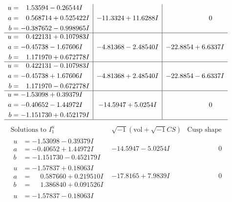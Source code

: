 \documentclass[1p]{elsarticle_modified}
\theoremstyle{definition}
\newcommand{\I}{\sqrt{-1}}
\begin{document}
$$\begin{array}{c|c|c}
\begin{aligned}
u &= \phantom{-}1.53594 - 0.26544 I \\
a &= \phantom{-}0.568714 + 0.525422 I \\
b &= -0.387652 - 0.998965 I\end{aligned}
 & -11.3324 + 11.6288 I & \phantom{-0.000000 } 0 \\ \hline\begin{aligned}
u &= \phantom{-}0.422131 + 0.107983 I \\
a &= -0.45738 - 1.67606 I \\
b &= \phantom{-}1.171970 + 0.672778 I\end{aligned}
 & -4.81368 - 2.48540 I & -22.8854 + 6.6337 I \\ \hline\begin{aligned}
u &= \phantom{-}0.422131 - 0.107983 I \\
a &= -0.45738 + 1.67606 I \\
b &= \phantom{-}1.171970 - 0.672778 I\end{aligned}
 & -4.81368 + 2.48540 I & -22.8854 - 6.6337 I \\ \hline\begin{aligned}
u &= -1.53098 + 0.39379 I \\
a &= -0.40652 - 1.44972 I \\
b &= -1.151730 + 0.452179 I\end{aligned}
 & -14.5947 + 5.0254 I & \phantom{-0.000000 } 0\\
 \hline 
 \end{array}$$\newpage$$\begin{array}{c|c|c}  
\text{Solutions to }I^u_{1}& \I (\text{vol} + \sqrt{-1}CS) & \text{Cusp shape}\\
 \hline 
\begin{aligned}
u &= -1.53098 - 0.39379 I \\
a &= -0.40652 + 1.44972 I \\
b &= -1.151730 - 0.452179 I\end{aligned}
 & -14.5947 - 5.0254 I & \phantom{-0.000000 } 0 \\ \hline\begin{aligned}
u &= -1.57837 + 0.18063 I \\
a &= \phantom{-}0.587660 + 0.219510 I \\
b &= \phantom{-}1.386840 + 0.091526 I\end{aligned}
 & -17.8165 + 7.9839 I & \phantom{-0.000000 } 0 \\ \hline\begin{aligned}
u &= -1.57837 - 0.18063 I \\

\end{aligned}
\end{array}$$
\end{document}
